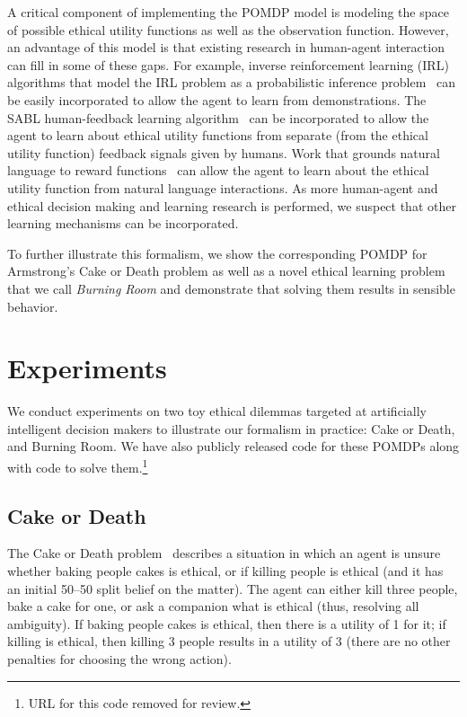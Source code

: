 \documentclass[11pt]{article}
\begin{document}
A critical component of implementing the POMDP model is modeling the space of possible ethical utility functions as well as the observation function. However, an advantage of this model is that existing research in human-agent interaction can fill in some of these gaps. For example, inverse reinforcement learning (IRL) algorithms that model the IRL problem as a probabilistic inference problem~\cite{ramachandran2007bayesian,ziebart2008maximum,babes2011apprenticeship,macglashan2015between} can be easily incorporated to allow the agent to learn from demonstrations. The SABL human-feedback learning algorithm~\cite{loftin2014strategy} can be incorporated to allow the agent to learn about ethical utility functions from separate (from the ethical utility function) feedback signals given by humans. Work that grounds natural language to reward functions~\cite{macglashanGrounding2015} can allow the agent to learn about the ethical utility function from natural language interactions. As more human-agent and ethical decision making and learning research is performed, we suspect that other learning mechanisms can be incorporated.

To further illustrate this formalism, we show the corresponding POMDP for Armstrong's Cake or Death problem as well as a novel ethical learning problem that we call {\em Burning Room} and demonstrate that solving them results in sensible behavior.



\section{Experiments}

We conduct experiments on two toy ethical dilemmas targeted at artificially intelligent decision makers to illustrate our formalism in practice: Cake or Death, and Burning Room. We have also publicly released code for these POMDPs along with code to solve them.\footnote{URL for this code removed for review.}

\subsection{Cake or Death}
The Cake or Death problem~\cite{AAAIW1510183} describes a situation in which an agent is unsure whether baking people cakes is ethical, or if killing people is ethical (and it has an initial 50--50 split belief on the matter). The agent can either kill three people, bake a cake for one, or ask a companion what is ethical (thus, resolving all ambiguity). If baking people cakes is ethical, then there is a utility of 1 for it; if killing is ethical, then killing 3 people results in a utility of 3 (there are no other penalties for choosing the wrong action).
\end{document}

